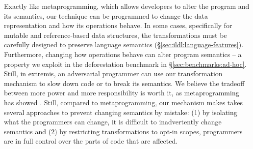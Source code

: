 Exactly like metaprogramming, which allows developers to alter the program and its semantics, our technique can be programmed to change the data representation and how its operations behave. In some cases, specifically for mutable and reference-based data structures, the transformations must be carefully designed to preserve language semantics (\S\ref{sec:ildl:language-features}). Furthermore, changing how operations behave can alter program semantics -- a property we exploit in the deforestation benchmark in \S\ref{sec:benchmarks:ad-hoc}. Still, in extremis, an adversarial programmer can use our transformation mechanism to slow down code or to break its semantics. We believe the tradeoff between more power and more responsibility is worth it, as metaprogramming has showed \cite{eugene-macros-scala13}. Still, compared to metaprogramming, our mechanism makes takes several approaches to prevent changing semantics by mistake: (1) by isolating what the programmers can change, it is difficult to inadvertently change semantics and (2) by restricting transformations to opt-in scopes, programmers are in full control over the parts of code that are affected.
